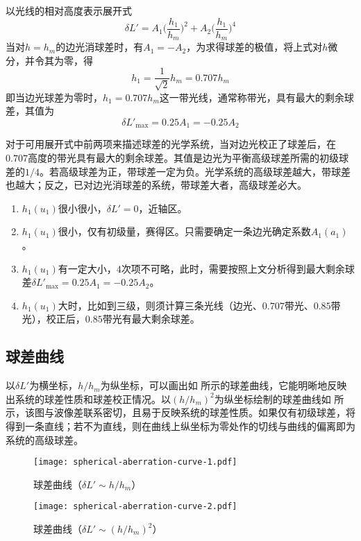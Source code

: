 \documentclass[cn,10pt,chinesefont=founder,math=newtx,cite=super,twoside]{elegantbook}
\begin{document}
以光线的相对高度表示展开式
\begin{equation}
\delta L'=A_1\bigg(\frac{h_1}{h_m}\bigg)^2+A_2\bigg(\frac{h_1}{h_m}\bigg)^4
\end{equation}
当对$h=h_m$的边光消球差时，有$A_1=-A_2$，为求得球差的极值，将上式对$h$微分，并令其为零，得
\begin{equation}
h_1=\frac{1}{\sqrt{2}}h_m=0.707h_m
\end{equation}
即当边光球差为零时，$h_1=0.707h_m$这一带光线，通常称带光，具有最大的剩余球差，其值为
\begin{equation}
\delta L'_{\max}=0.25A_1=-0.25A_2
\end{equation}
\begin{conclusion}
对于可用展开式中前两项来描述球差的光学系统，当对边光校正了球差后，在$0.707$高度的带光具有最大的剩余球差。其值是边光为平衡高级球差所需的初级球差的$1/4$。若高级球差为正，带球差一定为负。光学系统的高级球差越大，带球差也越大；反之，已对边光消球差的系统，带球差大者，高级球差必大。
\end{conclusion}
\begin{note}
	\begin{enumerate}
		\item $h_1(u_1)$很小很小，$\delta L'=0$，近轴区。
		\item $h_1(u_1)$很小，仅有初级量，赛得区。只需要确定一条边光确定系数$A_1(a_1)$。
		\item $h_1(u_1)$有一定大小，$4$次项不可略，此时，需要按照上文分析得到最大剩余球差$\delta L'_{\mathrm{max}}=0.25A_1=-0.25A_2$。
		\item $h_1(u_1)$大时，比如到三级，则须计算三条光线（边光、$0.707$带光、$0.85$带光），校正后，$0.85$带光有最大剩余球差。
	\end{enumerate}
\end{note}

\subsection{球差曲线}
以$\delta L'$为横坐标，$h/h_m$为纵坐标，可以画出如 所示的球差曲线，它能明晰地反映出系统的球差性质和球差校正情况。以$(h/h_m)^2$为纵坐标绘制的球差曲线如 所示，该图与波像差联系密切，且易于反映系统的球差性质。如果仅有初级球差，将得到一条直线；若不为直线，则在曲线上纵坐标为零处作的切线与曲线的偏离即为系统的高级球差。

\begin{figure}[htbp]
	\centering
	\begin{minipage}[t]{0.48\textwidth}
		\centering
		\texttt{[image: spherical-aberration-curve-1.pdf]}
		\caption{球差曲线（$\delta L'\sim h/h_m$）}
		\label{fig:spherical-aberration-curve-1}
	\end{minipage}
	\quad
	\begin{minipage}[t]{0.48\textwidth}
		\centering
		\texttt{[image: spherical-aberration-curve-2.pdf]}
		\caption{球差曲线（$\delta L'\sim (h/h_m)^2$）}
		\label{fig:spherical-aberration-curve-2}
	\end{minipage}
\end{figure}
\end{document}
